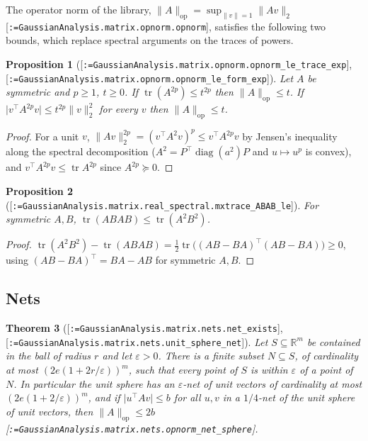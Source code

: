 \documentclass[11pt]{article}
\makeatletter
\newcommand{\formal@break}[1]{\@tfor\formal@tok:=#1\do{%
  \formal@tok
  \expandafter\ifx\formal@tok.\allowbreak\else
  \expandafter\ifx\formal@tok\_\allowbreak\fi\fi}}
\DeclareRobustCommand{\formal}[1]{\textnormal{[\texttt{\small\formal@break{#1}}]}}
\newcommand{\R}{\mathbb{R}}
\newcommand{\norm}[1]{\lVert #1\rVert}
\newcommand{\abs}[1]{\lvert #1\rvert}
\newcommand{\tr}{\operatorname{tr}}
\newcommand{\op}{\mathrm{op}}
\newcommand{\diag}{\operatorname{diag}}
\theoremstyle{plain}
\newtheorem{theorem}{Theorem}[section]
\newtheorem{proposition}[theorem]{Proposition}
\theoremstyle{definition}
\makeatother
\begin{document}
The operator norm of the library, $\norm{A}_\op = \sup_{\norm{v}=1}\norm{Av}_2$
\formal{GaussianAnalysis.matrix.opnorm.opnorm}, satisfies the following
two bounds, which replace spectral arguments on the traces of powers.

\begin{proposition}[\formal{GaussianAnalysis.matrix.opnorm.opnorm\_le\_trace\_exp}, \formal{GaussianAnalysis.matrix.opnorm.opnorm\_le\_form\_exp}]\label{prop:opnorm_trace}
Let $A$ be symmetric and $p \ge 1$, $t \ge 0$. If $\tr(A^{2p}) \le t^{2p}$ then
$\norm{A}_\op \le t$. If $\abs{v^{\top} A^{2p} v} \le t^{2p}\norm{v}_2^2$ for
every $v$ then $\norm{A}_\op \le t$.
\end{proposition}

\begin{proof}
For a unit $v$, $\norm{Av}_2^{2p} = (v^{\top}A^2 v)^p \le v^{\top} A^{2p} v$ by
Jensen's inequality along the spectral decomposition ($A^2 = P^{\top}\diag(a^2)P$
and $u \mapsto u^p$ is convex), and $v^{\top}A^{2p}v \le \tr A^{2p}$ since
$A^{2p} \succeq 0$.
\end{proof}

\begin{proposition}[\formal{GaussianAnalysis.matrix.real\_spectral.mxtrace\_ABAB\_le}]\label{prop:abab}
For symmetric $A, B$, $\tr(ABAB) \le \tr(A^2 B^2)$.
\end{proposition}

\begin{proof}
$\tr(A^2B^2) - \tr(ABAB) = \frac12 \tr\bigl((AB - BA)^{\top}(AB - BA)\bigr) \ge 0$,
using $(AB - BA)^{\top} = BA - AB$ for symmetric $A, B$.
\end{proof}

\subsection{Nets}\label{sec:nets}

\begin{theorem}[\formal{GaussianAnalysis.matrix.nets.net\_exists}, \formal{GaussianAnalysis.matrix.nets.unit\_sphere\_net}]\label{thm:nets}
Let $S \subseteq \R^m$ be contained in the ball of radius $r$ and let
$\varepsilon > 0$. There is a finite subset $N \subseteq S$, of cardinality at
most $(2e(1 + 2r/\varepsilon))^m$, such that every point of $S$ is within
$\varepsilon$ of a point of $N$. In particular the unit sphere has an
$\varepsilon$-net of unit vectors of cardinality at most $(2e(1 + 2/\varepsilon))^m$,
and if $\abs{u^{\top} A v} \le b$ for all $u, v$ in a $1/4$-net of the unit
sphere of unit vectors, then $\norm{A}_\op \le 2b$
\formal{GaussianAnalysis.matrix.nets.opnorm\_net\_sphere}.
\end{theorem}
\end{document}
